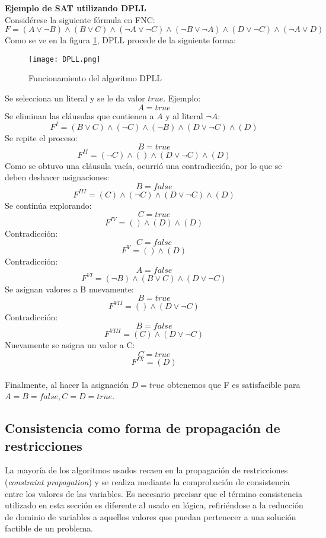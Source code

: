 \documentclass[12pt]{report}
\begin{document}
 
\textbf{Ejemplo de SAT utilizando DPLL}\\

Considérese la siguiente fórmula en FNC:
$F=(A\lor \neg B)\land(B\lor C)\land(\neg A\lor \neg C)\land(\neg B\lor \neg A)\land(D\lor \neg C)\land(\neg A\lor D)$\\

Como se ve en la figura \ref{fig:DPLL}, DPLL procede de la siguiente forma:

\begin{figure}[ht]
    \centering
    \texttt{[image: DPLL.png]}
    \caption{Funcionamiento del algoritmo DPLL}
    \label{fig:DPLL}
\end{figure}

Se selecciona un literal y se le da valor $true$. Ejemplo:
$$A=true$$
Se eliminan las cláusulas que contienen a $A$ y al literal $\neg A$:
$$F^I=(B\lor C)\land(\neg C)\land(\neg B)\land(D\lor \neg C)\land(D)$$
Se repite el proceso:
$$B=true$$
$$F^{II}=(\neg C)\land()\land(D\lor \neg C)\land(D)$$
Como se obtuvo una cláusula vacía, ocurrió una contradicción, por lo que se deben deshacer asignaciones:
$$B=false$$
$$F^{III}=(C)\land(\neg C)\land(D\lor \neg C)\land(D)$$
Se continúa explorando:
$$C=true$$
$$F^{IV}=()\land(D)\land(D)$$
Contradicción:
$$C=false$$
$$F^{V}=()\land(D)$$
Contradicción:
$$A=false$$
$$F^{VI}=(\neg B)\land(B\lor C)\land(D\lor \neg C)$$
Se asignan valores a B nuevamente:
$$B=true$$
$$F^{VII}=()\land(D\lor \neg C)$$
Contradicción:
$$B=false$$
$$F^{VIII}=(C)\land(D\lor \neg C)$$
Nuevamente se asigna un valor a C:
$$C=true$$
$$F^{IX}=(D)$$\\

Finalmente, al hacer la asignación $D=true$ obtenemos que F es satisfacible para $A=B=false, C=D=true$.

\subsection{Consistencia como forma de propagación de restricciones}

La mayoría de los algoritmos usados recaen en la propagación de restricciones (\textit{constraint propagation}) y se realiza mediante la comprobación de consistencia entre los valores de las variables. Es necesario precisar que el término consistencia utilizado en esta sección es diferente al usado en lógica, refiriéndose a la reducción de dominio de variables a aquellos valores que puedan pertenecer a una solución factible de un problema.\\
\end{document}
